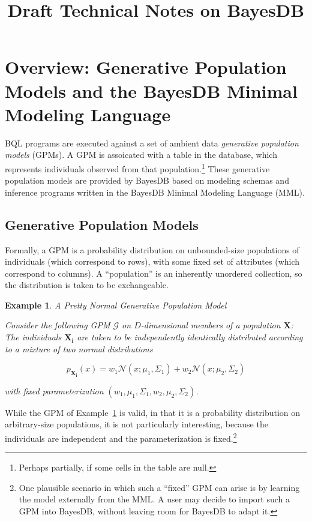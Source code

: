 \documentclass[10pt,letterpaper]{article}
\title{Draft Technical Notes on BayesDB}
\newtheorem{example}{Example}[section]
\begin{document}
\maketitle

\section{Overview: Generative Population Models and the BayesDB Minimal Modeling Language}
\label{sec:overview}

BQL programs are executed against a set of ambient data
\textit{generative population models} (GPMs).  A GPM is assoicated
with a table in the database, which represents individuals observed
from that population.\footnote{Perhaps partially, if some cells in the
  table are null.} These generative population models are provided by
BayesDB based on modeling schemas and inference programs written in
the BayesDB Minimal Modeling Language (MML).

\subsection{Generative Population Models}

Formally, a GPM is a probability distribution on unbounded-size
populations of individuals (which correspond to rows), with some fixed
set of attributes (which correspond to columns). A ``population'' is
an inherently unordered collection, so the distribution is taken to be
exchangeable.

\begin{example} \label{ex:normal_gpm} A Pretty Normal Generative Population 
Model

Consider the following GPM $\mathcal{G}$ on $D$-dimensional members of
a population $\mathbf{X}$: The individuals $\mathbf{X_i}$ are taken to
be independently identically distributed according to a mixture of two
normal distributions

\[ p_\mathbf{X_i}(x) = w_1\mathcal{N}(x;\mu_1,\Sigma_1) + w_2\mathcal{N}(x;\mu_2,\Sigma_2) \]

with fixed parameterization $(w_1, \mu_1, \Sigma_1, w_2, \mu_2, \Sigma_2)$.
\end{example}

While the GPM of Example~\ref{ex:normal_gpm} is valid, in that it is a
probability distribution on arbitrary-size populations, it is not
particularly interesting, because the individuals are independent and
the parameterization is fixed.\footnote{One plausible scenario in
  which such a ``fixed'' GPM can arise is by learning the model
  externally from the MML.  A user may decide to import such a GPM
  into BayesDB, without leaving room for BayesDB to adapt it.}
\end{document}
